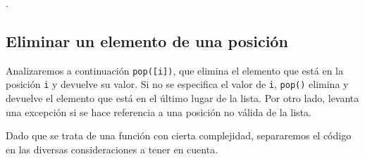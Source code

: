 .

\subsection{Eliminar un elemento de una posición}

Analizaremos a continuación \lstinline|pop([i])|, que elimina el elemento que
está en la posición \lstinline!i! y devuelve su valor. Si no se especifica
el valor de \lstinline!i!, \lstinline|pop()| elimina y devuelve el elemento
que está en el último lugar de la lista.  Por otro lado, levanta una
excepción si se hace referencia a una posición no válida de la lista.

Dado que se trata de una función con cierta complejidad, separaremos el
código en las diversas consideraciones a tener en cuenta.

